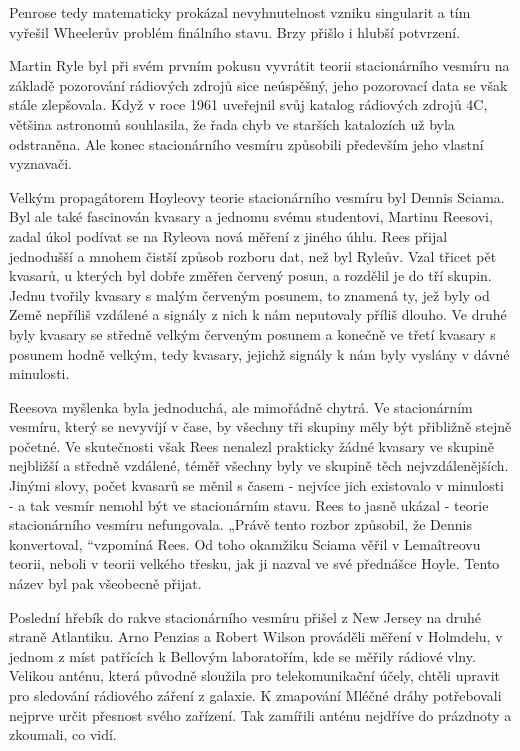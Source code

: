   Penrose tedy matematicky prokázal nevyhnutelnost vzniku singularit a tím vyřešil Wheelerův problém
  finálního stavu. Brzy přišlo i hlubší potvrzení. 

  Martin Ryle byl při svém prvním pokusu vyvrátit teorii stacionárního vesmíru na základě pozorování
  rádiových zdrojů sice neúspěšný, jeho pozorovací data se však stále zlepšovala. Když v roce 1961
  uveřejnil svůj katalog rádiových zdrojů 4C, většina astronomů souhlasila, že řada chyb ve starších
  katalozích už byla odstraněna. Ale konec stacionárního vesmíru způsobili především jeho vlastní
  vyznavači. 

  Velkým propagátorem Hoyleovy teorie stacionárního vesmíru byl Dennis Sciama. Byl ale také
  fascinován kvasary a jednomu svému studentovi, Martinu Reesovi, zadal úkol podívat se na Ryleova
  nová měření z jiného úhlu. Rees přijal jednodušší a mnohem čistší způsob rozboru dat, než byl
  Ryleův. Vzal třicet pět kvasarů, u kterých byl dobře změřen červený posun, a rozdělil je do tří
  skupin. Jednu tvořily kvasary s malým červeným posunem, to znamená ty, jež byly od Země nepříliš
  vzdálené a signály z nich k nám neputovaly příliš dlouho. Ve druhé byly kvasary se středně velkým
  červeným posunem a konečně ve třetí kvasary s posunem hodně velkým, tedy kvasary, jejichž signály
  k nám byly vyslány v dávné minulosti. 

  Reesova myšlenka byla jednoduchá, ale mimořádně chytrá. Ve stacionárním vesmíru, který se nevyvíjí
  v čase, by všechny tři skupiny měly být přibližně stejně početné. Ve skutečnosti však Rees
  nenalezl prakticky žádné kvasary ve skupině nejbližší a středně vzdálené, téměř všechny byly ve
  skupině těch nejvzdálenějších. Jinými slovy, počet kvasarů se měnil s časem - nejvíce jich
  existovalo v minulosti - a tak vesmír nemohl být ve stacionárním stavu. Rees to jasně ukázal -
  teorie stacionárního vesmíru nefungovala. „Právě tento rozbor způsobil, že Dennis konvertoval,
  “vzpomíná Rees. Od toho okamžiku Sciama věřil v Lemaîtreovu teorii, neboli v teorii velkého
  třesku, jak ji nazval ve své přednášce Hoyle. Tento název byl pak všeobecně přijat.

  Poslední hřebík do rakve stacionárního vesmíru přišel z New Jersey na druhé straně Atlantiku. Arno
  Penzias a Robert Wilson prováděli měření v Holmdelu, v jednom z míst patřících k Bellovým
  laboratořím, kde se měřily rádiové vlny. Velikou anténu, která původně sloužila pro
  telekomunikační účely, chtěli upravit pro sledování rádiového záření z galaxie. K zmapování Mléčné
  dráhy potřebovali nejprve určit přesnost svého zařízení. Tak zamířili anténu nejdříve do prázdnoty
  a zkoumali, co vidí. 

